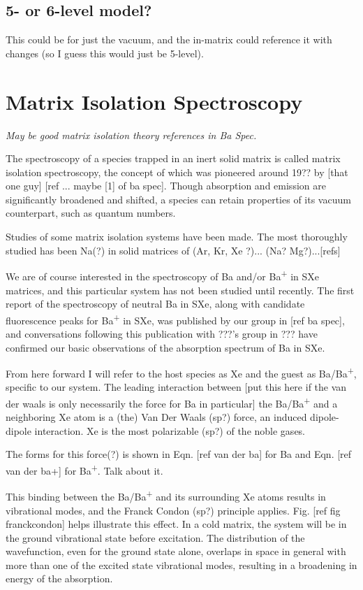 \subsection{5- or 6-level model?}

This could be for just the vacuum, and the in-matrix could reference it with changes (so I guess this would just be 5-level).

\section{Matrix Isolation Spectroscopy}

\emph{\color{gray}May be good matrix isolation theory references in Ba Spec.}

The spectroscopy of a species trapped in an inert solid matrix is called matrix isolation spectroscopy, the concept of which was pioneered around 19?? by [that one guy] [ref ... maybe [1] of ba spec].  Though absorption and emission are significantly broadened and shifted, a species can retain properties of its vacuum counterpart, such as quantum numbers.

Studies of some matrix isolation systems have been made.  The most thoroughly studied has been Na(?) in solid matrices of (Ar, Kr, Xe ?)... (Na? Mg?)...[refs]

We are of course interested in the spectroscopy of Ba and/or Ba\textsuperscript{+} in SXe matrices, and this particular system has not been studied until recently.  The first report of the spectroscopy of neutral Ba in SXe, along with candidate fluorescence peaks for Ba\textsuperscript{+} in SXe, was published by our group in [ref ba spec], and conversations following this publication with ???'s group in ??? have confirmed our basic observations of the absorption spectrum of Ba in SXe.  

From here forward I will refer to the host species as Xe and the guest as Ba/Ba\textsuperscript{+}, specific to our system.  The leading interaction between {\color{gray}[put this here if the van der waals is only necessarily the force for Ba in particular]} the Ba/Ba\textsuperscript{+} and a neighboring Xe atom is a {\color{gray}(the)} Van Der Waals (sp?) force, an induced dipole-dipole interaction.  Xe is the most polarizable (sp?) of the noble gases.  

The forms for this force(?) is shown in Eqn. [ref van der ba] for Ba and Eqn. [ref van der ba+] for Ba\textsuperscript{+}.  {\color{gray}Talk about it.}

This binding between the Ba/Ba\textsuperscript{+} and its surrounding Xe atoms results in vibrational modes, and the Franck Condon (sp?) principle applies.  Fig. [ref fig franckcondon] helps illustrate this effect.  In a cold matrix, the system will be in the ground vibrational state before excitation.  The distribution of the wavefunction, even for the ground state alone, overlaps in space in general with more than one of the excited state vibrational modes, resulting in a broadening in energy of the absorption.

